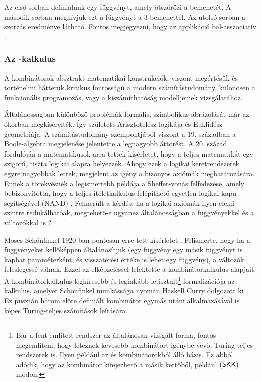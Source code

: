\documentclass[a4paper,oneside,12pt]{article}
\begin{document}
Az első sorban definiálunk egy függvényt, amely ötszörözi a bemenetét. A második sorban meghívjuk ezt a függvényt a $3$ bemenettel. Az utolsó sorban a szorzás eredménye látható. Fontos megjegyezni, hogy az applikáció bal-asszociatív \cite{pierceTypesProgrammingLanguages2002a}.

\subsubsection{Az \ski-kalkulus}
\label{sec:a-ski-kalkulus-def}

A kombinátorok absztrakt matematikai konstrukciók, viszont megértésük és történelmi hátterük kritikus fontosságú a modern számítástudomány, különösen a funkcionális programozás, vagy a kiszámíthatóság modelljeinek vizsgálatához.

Általánosságban különböző problémák formális, szimbolikus ábrázolását már az ókorban megkísérelték. Így született Arisztotelész logikája és Euklidész geometriája. A számítástudomány szempontjából viszont a 19. században a Boole-algebra megjelenése jelentette a legnagyobb áttörést. A 20. század fordulóján a matematikusok arra tettek kísérletet, hogy a teljes matematikát egy szigorú, tiszta logikai alapra helyezzék. Ahogy ezek a logikai keretrendszerek egyre nagyobbak lettek, megjelent az igény a bizonyos axiómák meghatározására. Ennek a törekvésnek a legismertebb példája a Sheffer-vonás felfedezése, amely bebizonyította, hogy a teljes ítéletkalkulus felépíthető egyetlen logikai kapu segítségével (NAND) \cite{shefferSetFiveIndependent1913}. Felmerült a kérdés: ha a logikai axiómák ilyen elemi szintre redukálhatóak, megtehető-e ugyanez általánosságban a függvényekkel és a változókkal is \cite{pierceTypesProgrammingLanguages2002a}?

Moses Schönfinkel 1920-ban pontosan erre tett kísérletet \cite{schoenfinkelUeberBausteineMathematischen1924}. Felismerte, hogy ha a függvényeket kellőképpen általánosítjuk (egy függvény egy másik függvényt is kaphat paraméterként, és visszatérési értéke is lehet egy függvény), a változók feleslegessé válnak. Ezzel az elképzeléssel lefektette a kombinátorkalkulus  alapjait. A kombinátorkalkulus leghíresebb és leginkább letisztult\footnote{Bár a fent említett \ski rendszer az általánosan vizsgált forma, fontos megemlíteni, hogy léteznek kevesebb kombinátort igénybe vevő, Turing-teljes rendszerek is. Ilyen például az \Scomb és \Kcomb kombinátorokból álló bázis. Ez abból adódik, hogy az \Icomb kombinátor kifejezhető a másik kettőből, például \(\left(\textsf{S}\textsf{K}\textsf{K}\right)\) módon.} formalizációja az \ski-kalkulus, amelyet Schönfinkel munkássága nyomán Haskell Curry dolgozott ki \cite{curryGrundlagenKombinatorischenLogik1930}. Ez pusztán három előre definiált kombinátor egymás utáni alkalmazásával is képes Turing-teljes számítások leírására.
\end{document}
